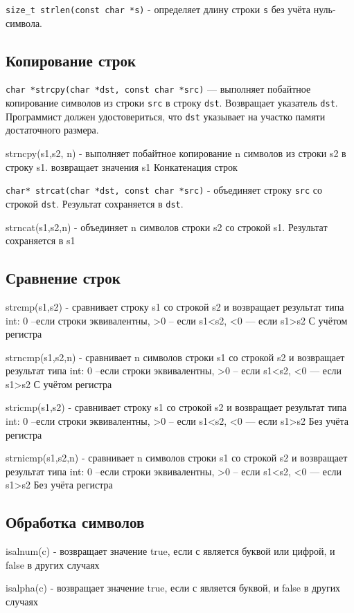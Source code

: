 \verb|size_t strlen(const char *s)| - определяет длину строки \verb|s| без учёта нуль-символа.

\subsection*{Копирование строк}

\verb|char *strcpy(char *dst, const char *src)| --- выполняет побайтное копирование символов из строки \verb|src|
в строку \verb|dst|. Возвращает указатель \verb|dst|. Программист должен удостовериться, что \verb|dst| указывает
на участко памяти достаточного размера.

strncpy(s1,s2, n) - выполняет побайтное копирование n символов из строки  s2 в строку s1. возвращает значения s1
Конкатенация строк

\verb|char* strcat(char *dst, const char *src)| - объединяет строку \verb|src| со строкой \verb|dst|.
Результат сохраняется в \verb|dst|. 

strncat(s1,s2,n) - объединяет n символов строки s2 со строкой s1. Результат сохраняется в s1
\subsection*{Сравнение строк}

strcmp(s1,s2) - сравнивает строку s1 со строкой s2 и возвращает результат типа int:
0 –если строки эквивалентны, >0 – если s1<s2,  <0  — если s1>s2 С учётом регистра

strncmp(s1,s2,n) - сравнивает n символов строки s1 со строкой s2 и возвращает результат типа int:
0 –если строки эквивалентны, >0 – если s1<s2,  <0  — если s1>s2 С учётом регистра

stricmp(s1,s2) - сравнивает строку s1 со строкой s2 и возвращает результат типа int:
0 –если строки эквивалентны, >0 – если s1<s2,  <0  — если s1>s2 Без учёта регистра

strnicmp(s1,s2,n) - сравнивает n символов строки s1 со строкой s2 и возвращает результат типа int:
0 –если строки эквивалентны, >0 – если s1<s2,  <0 — если s1>s2 Без учёта регистра
\subsection*{Обработка символов}

isalnum(c) - возвращает значение true, если с является буквой или цифрой, и false в других случаях

isalpha(c) - возвращает значение true, если с является буквой,  и false в других случаях

